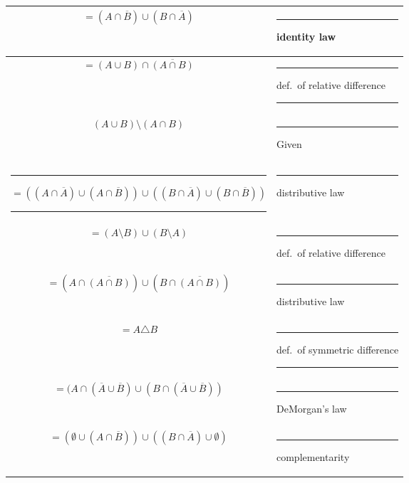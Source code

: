 \documentclass{amsart}
\begin{document}
\begin{enumerate}
\hspace{-1.1in}
\begin{tabular}{|c|l|}\hline
\rule[-18pt]{0pt}{48pt}$= (A \cap \overline{B}) \cup (B \cap \overline{A})$ & \rule{12pt}{0pt} identity law \\\hline
\rule[-18pt]{0pt}{48pt}$= (A \cup B) \cap \overline{(A \cap B)}$ & \rule{12pt}{0pt} def.\ of relative difference \rule{12pt}{0pt} \\\hline
\rule[-18pt]{0pt}{48pt}$(A \cup B) \setminus (A \cap B)$ & \rule{12pt}{0pt} Given  \\\hline
\rule[-18pt]{0pt}{48pt}\rule{12pt}{0pt}$= ((A \cap \overline{A}) \cup (A \cap \overline{B})) \cup ((B \cap \overline{A}) \cup (B \cap \overline{B}))$ \rule{12pt}{0pt} & \rule{12pt}{0pt} distributive law  \\\hline
\rule[-18pt]{0pt}{48pt}$= (A \setminus B) \cup (B \setminus A)$ & \rule{12pt}{0pt}  def.\ of relative difference \\\hline
\rule[-18pt]{0pt}{48pt}$= (A \cap \overline{(A \cap B)}) \cup (B \cap \overline{(A \cap B)})$ & \rule{12pt}{0pt} distributive law \\\hline
\rule[-18pt]{0pt}{48pt}$= A \triangle B $ & \rule{12pt}{0pt} def.\ of symmetric difference \rule{12pt}{0pt}\\\hline
\rule[-18pt]{0pt}{48pt}$= (A \cap (\overline{A} \cup \overline{B}) \cup (B \cap (\overline{A} \cup \overline{B}))$ & \rule{12pt}{0pt} DeMorgan's law \\\hline
\rule[-18pt]{0pt}{48pt}$= (\emptyset \cup (A \cap \overline{B})) \cup ((B \cap \overline{A}) \cup \emptyset)$ & \rule{12pt}{0pt} complementarity \\\hline
\end{tabular}


\end{enumerate}
\end{document}
